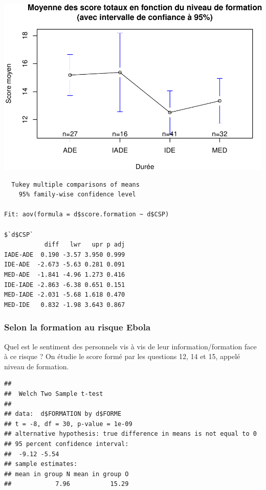 \documentclass[]{article}
\newenvironment{Shaded}{\begin{snugshade}}{\end{snugshade}}
\newcommand{\KeywordTok}[1]{\textcolor[rgb]{0.13,0.29,0.53}{\textbf{{#1}}}}
\newcommand{\StringTok}[1]{\textcolor[rgb]{0.31,0.60,0.02}{{#1}}}
\newcommand{\NormalTok}[1]{{#1}}
\begin{document}
\includegraphics{analyse_files/figure-latex/unnamed-chunk-17-1.pdf}

\begin{verbatim}
  Tukey multiple comparisons of means
    95% family-wise confidence level

Fit: aov(formula = d$score.formation ~ d$CSP)

$`d$CSP`
           diff   lwr   upr p adj
IADE-ADE  0.190 -3.57 3.950 0.999
IDE-ADE  -2.673 -5.63 0.281 0.091
MED-ADE  -1.841 -4.96 1.273 0.416
IDE-IADE -2.863 -6.38 0.651 0.151
MED-IADE -2.031 -5.68 1.618 0.470
MED-IDE   0.832 -1.98 3.643 0.867
\end{verbatim}

\subsubsection{Selon la formation au risque
Ebola}\label{selon-la-formation-au-risque-ebola}

Quel est le sentiment des personnels vis à vis de leur
information/formation face à ce risque ? On étudie le score formé par
les questions 12, 14 et 15, appelé niveau de formation.

\begin{Shaded}
\end{Shaded}

\begin{verbatim}
## 
##  Welch Two Sample t-test
## 
## data:  d$FORMATION by d$FORME
## t = -8, df = 30, p-value = 1e-09
## alternative hypothesis: true difference in means is not equal to 0
## 95 percent confidence interval:
##  -9.12 -5.54
## sample estimates:
## mean in group N mean in group O 
##            7.96           15.29
\end{verbatim}
\end{document}
